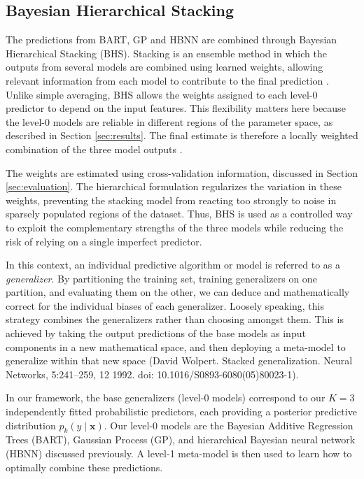 \subsection{Bayesian Hierarchical Stacking}
The predictions from BART, GP and HBNN are combined through Bayesian Hierarchical Stacking (BHS). Stacking is an ensemble method in which the outputs from several models are combined using learned weights, allowing relevant information from each model to contribute to the final prediction \citep{wolpert1992stacked}. Unlike simple averaging, BHS allows the weights assigned to each level-0 predictor to depend on the input features. This flexibility matters here because the level-0 models are reliable in different regions of the parameter space, as described in Section \ref{sec:results}. The final estimate is therefore a locally weighted combination of the three model outputs \citep{yao2022hierarchicalstacking}.

The weights are estimated using cross-validation information, discussed in Section \ref{sec:evaluation}. The hierarchical formulation regularizes the variation in these weights, preventing the stacking model from reacting too strongly to noise in sparsely populated regions of the dataset. Thus, BHS is used as a controlled way to exploit the complementary strengths of the three models while reducing the risk of relying on a single imperfect predictor.


\iffalse

In this context, an individual predictive algorithm or model is referred to as a \textit{generalizer}. By partitioning the training set, training generalizers on one partition, and evaluating them on the other, we can deduce and mathematically correct for the individual biases of each generalizer. Loosely speaking, this strategy combines the generalizers rather than choosing amongst them. This is achieved by taking the output predictions of the base models as input components in a new mathematical space, and then deploying a meta-model to generalize within that new space (David Wolpert. Stacked generalization. Neural Networks, 5:241–259, 12 1992. doi: 10.1016/S0893-6080(05)80023-1).

In our framework, the base generalizers (level-0 models) correspond to our $K=3$ independently fitted probabilistic predictors, each providing a posterior predictive distribution $p_k(y \mid \mathbf{x})$. Our level-0 models are the Bayesian Additive Regression Trees (BART), Gaussian Process (GP), and hierarchical Bayesian neural network (HBNN) discussed previously. A level-1 meta-model is then used to learn how to optimally combine these predictions.


